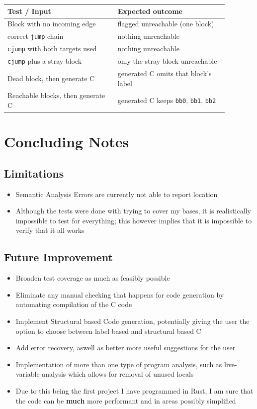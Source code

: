 \documentclass[11pt,a4paper,oneside]{report}
\begin{document}
		\begin{longtable}{p{0.44\linewidth}p{0.44\linewidth}}
		\toprule
		\textbf{Test / Input} & \textbf{Expected outcome} \\
		\midrule
		\endhead
		Block with no incoming edge        & flagged unreachable (one block) \\
		\midrule
		correct \texttt{jump} chain  & nothing unreachable \\
		\midrule
		\texttt{cjump} with both targets used & nothing unreachable \\
		\midrule
		\texttt{cjump} plus a stray block  & only the stray block unreachable \\
		\midrule
		Dead block, then generate C        & generated C omits that block's label \\
		\midrule
		Reachable blocks, then generate C  & generated C keeps \texttt{bb0}, \texttt{bb1}, \texttt{bb2} \\
		\bottomrule
	\end{longtable}
	
	
	\chapter{Concluding Notes}
	
	\section{Limitations}
		\begin{itemize}[leftmargin=*]
			\item Semantic Analysis Errors are currently not able to report location
			\item Although the tests were done with trying to cover my bases, it is realistically impossible to test for everything; this however implies that it is impossible to verify that it all works 
		\end{itemize}
	
	\section{Future Improvement}
	\begin{itemize}[leftmargin=*]
		\item Broaden test coverage as much as feasibly possible
		\item Eliminate any manual checking that happens for code generation by automating compilation of the C code
		\item Implement Structural based Code generation, potentially giving the user the option to choose between label based and structural based C
		\item Add error recovery, aswell as better more useful suggestions for the user
		\item Implementation of more than one type of program analysis, such as live-variable analysis which allows for removal of unused locals
		\item Due to this being the first project I have programmed in Rust, I am sure that the code can be \textbf{much} more performant and in areas possibly simplified
	\end{itemize}
	
\end{document}
